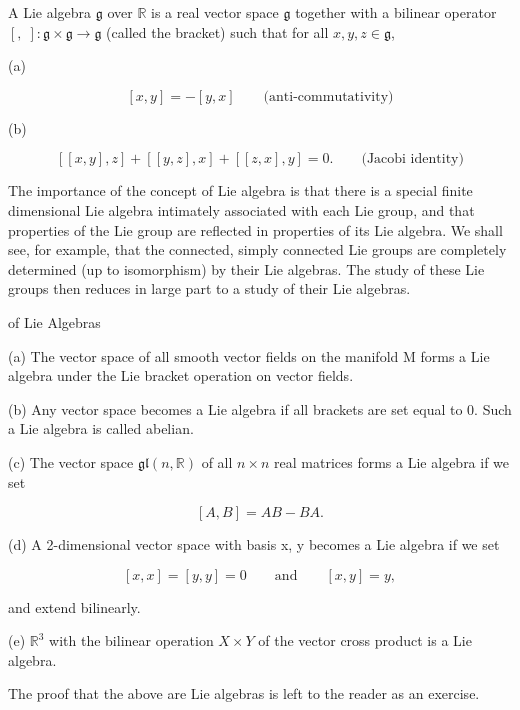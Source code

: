 \begin{definition}\label{thm:3.4}
A Lie algebra $\mathfrak{g}$ over $\mathbb{R}$ is a real vector space $\mathfrak{g}$ together with a bilinear operator $[,\;]\colon\mathfrak{g}\times\mathfrak{g}\to\mathfrak{g}$ (called the bracket) such that for all $x,y,z\in\mathfrak{g}$,

(a)

\[
[x,y]=-[y,x]\qquad\text{(anti-commutativity)}
\]

(b)

\[
[[x,y],z]+[[y,z],x]+[[z,x],y]=0.\qquad\text{(Jacobi identity)}
\]

The importance of the concept of Lie algebra is that there is a special finite dimensional Lie algebra intimately associated with each Lie group, and that properties of the Lie group are reflected in properties of its Lie algebra. We shall see, for example, that the connected, simply connected Lie groups are completely determined (up to isomorphism) by their Lie algebras. The study of these Lie groups then reduces in large part to a study of their Lie algebras.

\end{definition}

\begin{examples}{of Lie Algebras}\label{thm:3.5}

(a) The vector space of all smooth vector fields on the manifold M forms a Lie algebra under the Lie bracket operation on vector fields.

(b) Any vector space becomes a Lie algebra if all brackets are set equal to 0. Such a Lie algebra is called abelian.

(c) The vector space  $ \mathfrak{gl}(n,\mathbb{R}) $ of all  $ n \times n $ real matrices forms a Lie algebra if we set

\[
[A,B]=A B-B A.
\]

(d) A 2-dimensional vector space with basis x, y becomes a Lie algebra if we set

\[
[x,x]=[y,y]=0\qquad\mathrm{and}\qquad[x,y]=y,
\]

and extend bilinearly.

(e)  $ \mathbb{R}^{3} $ with the bilinear operation  $ X \times Y $ of the vector cross product is a Lie algebra.

The proof that the above are Lie algebras is left to the reader as an exercise.

\end{examples}

